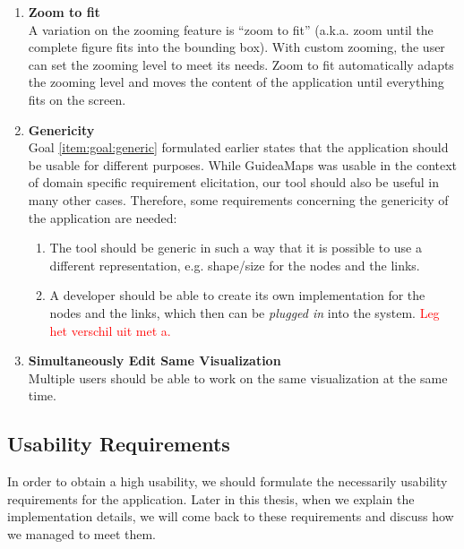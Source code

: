 \begin{enumerate}[label=\textbf{\arabic*}., ref=\arabic*]
	\item \textbf{Zoom to fit\label{item:zoom-to-fit}} \hfill \\
	A variation on the zooming feature is ``zoom to fit'' (a.k.a. zoom until the complete figure fits into the bounding box). With custom zooming, the user can set the zooming level to meet its needs. Zoom to fit automatically adapts the zooming level and moves the content of the application until everything fits on the screen.
	
	\item \textbf{Genericity\label{item:genericity}} \hfill \\
	Goal \ref{item:goal:generic} formulated earlier states that the application should be usable for different purposes. While GuideaMaps was usable in the context of domain specific requirement elicitation, our tool should also be useful in many other cases. Therefore, some requirements concerning the genericity of the application are needed:
  	\begin{enumerate}
		\item The tool should be generic in such a way that it is possible to use a different representation, e.g. shape/size for the nodes and the links.
		\item A developer should be able to create its own implementation for the nodes and the links, which then can be \textit{plugged in} into the system. \textcolor{red}{Leg het verschil uit met a.}
	\end{enumerate}
	
	\item \textbf{Simultaneously Edit Same Visualization\label{item:work-simultaneously}} \hfill \\
	Multiple users should be able to work on the same visualization at the same time.
  
\end{enumerate}



\subsection{Usability Requirements}\label{sec:usability-requirements}
In order to obtain a high usability, we should formulate the necessarily usability requirements for the application. Later in this thesis, when we explain the implementation details, we will come back to these requirements and discuss how we managed to meet them.


